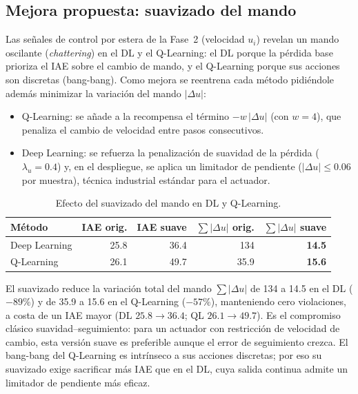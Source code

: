 \subsection*{Mejora propuesta: suavizado del mando}

Las señales de control por estera de la Fase~2 (velocidad $u_i$) revelan un mando oscilante (\emph{chattering}) en el DL y el Q-Learning: el DL porque la pérdida base prioriza el IAE sobre el cambio de mando, y el Q-Learning porque sus acciones son discretas (bang-bang). Como mejora se reentrena cada método pidiéndole además minimizar la variación del mando $|\Delta u|$:
\begin{itemize}
  \item Q-Learning: se añade a la recompensa el término $-w\,|\Delta u|$ (con $w=4$), que penaliza el cambio de velocidad entre pasos consecutivos.
  \item Deep Learning: se refuerza la penalización de suavidad de la pérdida ($\lambda_u=0.4$) y, en el despliegue, se aplica un limitador de pendiente ($|\Delta u|\leq 0.06$ por muestra), técnica industrial estándar para el actuador.
\end{itemize}


\begin{table}[H]
\centering
\caption{Efecto del suavizado del mando en DL y Q-Learning.}
\label{tab:suavizado_mando}
\small
\begin{tabular}{@{}lrrrr@{}}
\toprule
Método & IAE orig. & IAE suave & $\sum|\Delta u|$ orig. & $\sum|\Delta u|$ suave \\ \midrule
Deep Learning & 25.8 & 36.4 & 134 & \textbf{14.5} \\
Q-Learning    & 26.1 & 49.7 & \phantom{0}35.9 & \textbf{15.6} \\
\bottomrule
\end{tabular}
\end{table}

El suavizado reduce la variación total del mando $\sum|\Delta u|$ de 134 a 14.5 en el DL ($-89\%$) y de 35.9 a 15.6 en el Q-Learning ($-57\%$), manteniendo cero violaciones, a costa de un IAE mayor (DL $25.8\to36.4$; QL $26.1\to49.7$). Es el compromiso clásico suavidad--seguimiento: para un actuador con restricción de velocidad de cambio, esta versión suave es preferible aunque el error de seguimiento crezca. El bang-bang del Q-Learning es intrínseco a sus acciones discretas; por eso su suavizado exige sacrificar más IAE que en el DL, cuya salida continua admite un limitador de pendiente más eficaz.


